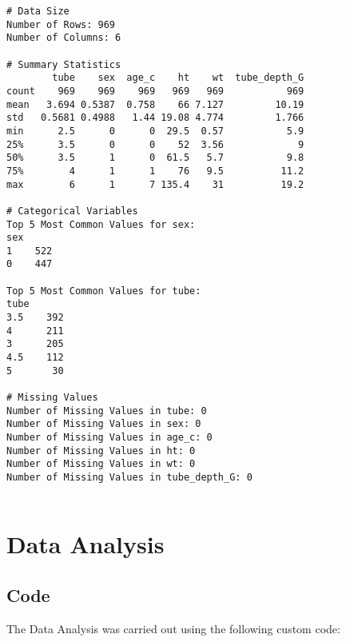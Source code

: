\documentclass[11pt]{article}
\begin{document}
\begin{Verbatim}[tabsize=4]
# Data Size
Number of Rows: 969
Number of Columns: 6

# Summary Statistics
        tube    sex  age_c    ht    wt  tube_depth_G
count    969    969    969   969   969           969
mean   3.694 0.5387  0.758    66 7.127         10.19
std   0.5681 0.4988   1.44 19.08 4.774         1.766
min      2.5      0      0  29.5  0.57           5.9
25%      3.5      0      0    52  3.56             9
50%      3.5      1      0  61.5   5.7           9.8
75%        4      1      1    76   9.5          11.2
max        6      1      7 135.4    31          19.2

# Categorical Variables
Top 5 Most Common Values for sex:
sex
1    522
0    447

Top 5 Most Common Values for tube:
tube
3.5    392
4      211
3      205
4.5    112
5       30

# Missing Values
Number of Missing Values in tube: 0
Number of Missing Values in sex: 0
Number of Missing Values in age_c: 0
Number of Missing Values in ht: 0
Number of Missing Values in wt: 0
Number of Missing Values in tube_depth_G: 0


\end{Verbatim}

\section{Data Analysis}
\subsection{{Code}}
The Data Analysis was carried out using the following custom code:
\end{document}
